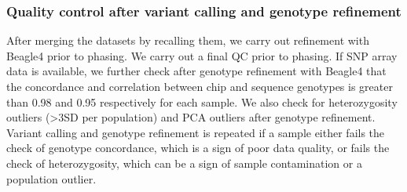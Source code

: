 \subsubsection{Quality control after variant calling and genotype refinement}
After merging the datasets by recalling them, we carry out refinement with Beagle4 prior to phasing. We carry out a final QC prior to phasing. If SNP array data is available, we further check after genotype refinement with Beagle4 that the concordance and correlation between chip and sequence genotypes is greater than 0.98 and 0.95 respectively for each sample. We also check for heterozygosity outliers (\textgreater3SD per population) and PCA outliers after genotype refinement. Variant calling and genotype refinement is repeated if a sample either fails the check of genotype concordance, which is a sign of poor data quality, or fails the check of heterozygosity, which can be a sign of sample contamination or a population outlier.